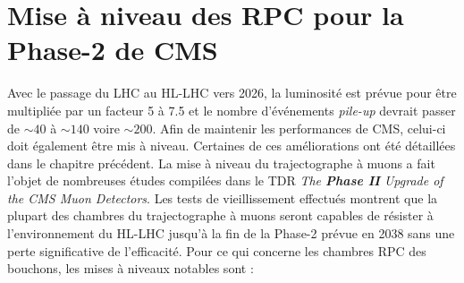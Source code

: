 \section{Mise à niveau des RPC pour la Phase-2 de CMS}
Avec le passage du LHC au HL-LHC vers 2026, la luminosité est prévue pour être multipliée par un facteur \num{5} à \num{7.5} et le nombre d'événements \textit{pile-up} devrait passer de $\sim 40$ à $\sim 140$ voire $\sim 200$. Afin de maintenir les performances de CMS, celui-ci doit également être mis à niveau. Certaines de ces améliorations ont été détaillées dans le chapitre précédent. La mise à niveau du trajectographe à muons a fait l'objet de nombreuses études compilées dans le TDR \textit{The \textbf{Phase II} Upgrade of the CMS Muon Detectors}. Les tests de vieillissement effectués montrent que la plupart des chambres du trajectographe à muons seront capables de résister à l'environnement du HL-LHC jusqu'à la fin de la Phase-2 prévue en \num{2038} sans une perte significative de l'efficacité. Pour ce qui concerne les chambres RPC des bouchons, les mises à niveaux notables sont :

